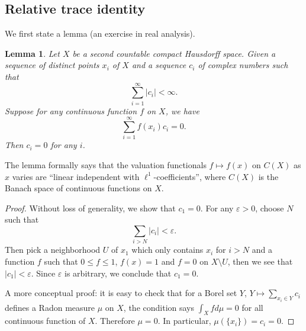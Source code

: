 \documentclass[11pt, reqno]{amsart}
\numberwithin{equation}{subsection}
\theoremstyle{plain}
\newtheorem{lem}[proposition]{Lemma}
\theoremstyle{definition}
\begin{document}
\subsection{Relative trace identity}


We first state a lemma (an exercise in real analysis).
\begin{lem} \label{lem:l^1_linearly_independent}
    Let $X$ be a second countable compact Hausdorff space. Given a sequence of distinct points $x_i$ of $X$ and a sequence $c_i$ of complex numbers such that
    \begin{equation*}
        \sum_{i=1}^{\infty} \lvert c_i \rvert < \infty.
    \end{equation*}
    Suppose for any continuous function $f$ on $X$, we have
    \begin{equation*}
        \sum_{i=1}^{\infty} f(x_i)c_i = 0.
    \end{equation*}
    Then $c_i=0$ for any $i$. 
\end{lem}
The lemma formally says that the valuation functionals $f \mapsto f(x)$ on $C(X)$ as $x$ varies are “linear independent with $\ell^1$-coefficients”, where $C(X)$ is the Banach space of continuous functions on $X$.

\begin{proof}
    Without loss of generality, we show that $c_1=0$. For any $\varepsilon>0$, choose $N$ such that
    \begin{equation*}
        \sum_{i>N} \lvert c_i \rvert < \varepsilon.
    \end{equation*}
    Then pick a neighborhood $U$ of $x_1$ which only contains $x_i$ for $i>N$ and a function $f$ such that $0 \le f \le 1$, $f(x)=1$ and $f=0$ on $X \setminus U$, then we see that $\lvert c_1 \rvert < \varepsilon$. Since $\varepsilon$ is arbitrary, we conclude that $c_1 = 0$.

    A more conceptual proof: it is easy to check that for a Borel set $Y$, $Y \mapsto \sum_{x_i \in Y} c_i$ defines a Radon measure $\mu$ on $X$, the condition says $\int_X f d \mu = 0$ for all continuous function of $X$. Therefore $\mu=0$. In particular, $\mu \left( \{ x_i\} \right) = c_i = 0$.
\end{proof}
\end{document}
